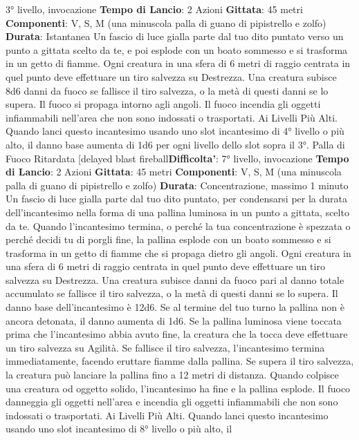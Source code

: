 \begin{multicols}{2}
3° livello, invocazione
\textbf{Tempo di Lancio}: 2 Azioni
\textbf{Gittata}: 45 metri
\textbf{Componenti}: V, S, M (una minuscola palla di guano di
pipistrello e zolfo)
\textbf{Durata}: Istantanea
Un fascio di luce gialla parte dal tuo dito puntato verso
un punto a gittata scelto da te, e poi esplode con un
boato sommesso e si trasforma in un getto di fiamme.
Ogni creatura in una sfera di 6 metri di raggio centrata
in quel punto deve effettuare un tiro salvezza su
Destrezza. Una creatura subisce 8d6 danni da fuoco se
fallisce il tiro salvezza, o la metà di questi danni se lo
supera.
Il fuoco si propaga intorno agli angoli. Il fuoco incendia
gli oggetti infiammabili nell’area che non sono indossati
o trasportati.
Ai Livelli Più Alti. Quando lanci questo incantesimo
usando uno slot incantesimo di 4° livello o più alto, il
danno base aumenta di 1d6 per ogni livello dello slot
sopra il 3°.
Palla di Fuoco Ritardata
[delayed blast fireball\textbf{Difficolta'}:
7° livello, invocazione
\textbf{Tempo di Lancio}: 2 Azioni
\textbf{Gittata}: 45 metri
\textbf{Componenti}: V, S, M (una minuscola palla di guano di
pipistrello e zolfo)
\textbf{Durata}: Concentrazione, massimo 1 minuto
Un fascio di luce gialla parte dal tuo dito puntato, per
condensarsi per la durata dell’incantesimo nella forma
di una pallina luminosa in un punto a gittata, scelto da
te. Quando l’incantesimo termina, o perché la tua
concentrazione è spezzata o perché decidi tu di porgli
fine, la pallina esplode con un boato sommesso e si
trasforma in un getto di fiamme che si propaga dietro gli
angoli. Ogni creatura in una sfera di 6 metri di raggio
centrata in quel punto deve effettuare un tiro salvezza
su Destrezza. Una creatura subisce danni da fuoco pari
al danno totale accumulato se fallisce il tiro salvezza, o
la metà di questi danni se lo supera.
Il danno base dell’incantesimo è 12d6. Se al termine del
tuo turno la pallina non è ancora detonata, il danno
aumenta di 1d6.
Se la pallina luminosa viene toccata prima che
l’incantesimo abbia avuto fine, la creatura che la tocca
deve effettuare un tiro salvezza su Agilità. Se
fallisce il tiro salvezza, l’incantesimo termina
immediatamente, facendo eruttare fiamme dalla pallina.
Se supera il tiro salvezza, la creatura può lanciare la
pallina fino a 12 metri di distanza. Quando colpisce una
creatura od oggetto solido, l’incantesimo ha fine e la
pallina esplode.
Il fuoco danneggia gli oggetti nell’area e incendia gli
oggetti infiammabili che non sono indossati o
trasportati.
Ai Livelli Più Alti. Quando lanci questo incantesimo
usando uno slot incantesimo di 8° livello o più alto, il

\end{multicols}
